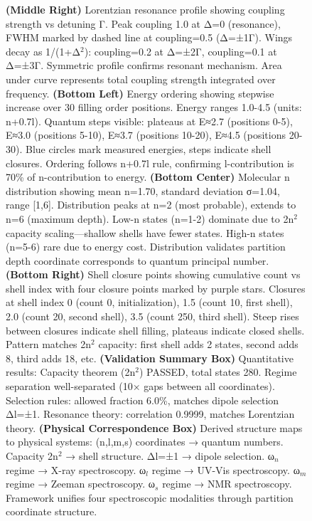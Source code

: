 \begin{figure}[htbp]
{    \textbf{(Middle Right)} Lorentzian resonance profile showing coupling strength vs detuning Γ. Peak coupling 1.0 at Δ=0 (resonance), FWHM marked by dashed line at coupling=0.5 (Δ=±1Γ). Wings decay as 1/(1+Δ$^2$): coupling=0.2 at Δ=±2Γ, coupling=0.1 at Δ=±3Γ. Symmetric profile confirms resonant mechanism. Area under curve represents total coupling strength integrated over frequency. 
    \textbf{(Bottom Left)} Energy ordering showing stepwise increase over 30 filling order positions. Energy ranges 1.0-4.5 (units: n+0.7l). Quantum steps visible: plateaus at E≈2.7 (positions 0-5), E≈3.0 (positions 5-10), E≈3.7 (positions 10-20), E≈4.5 (positions 20-30). Blue circles mark measured energies, steps indicate shell closures. Ordering follows n+0.7l rule, confirming l-contribution is 70\% of n-contribution to energy. 
    \textbf{(Bottom Center)} Molecular n distribution showing mean n=1.70, standard deviation σ=1.04, range [1,6]. Distribution peaks at n=2 (most probable), extends to n=6 (maximum depth). Low-n states (n=1-2) dominate due to 2n$^2$ capacity scaling—shallow shells have fewer states. High-n states (n=5-6) rare due to energy cost. Distribution validates partition depth coordinate corresponds to quantum principal number. 
    \textbf{(Bottom Right)} Shell closure points showing cumulative count vs shell index with four closure points marked by purple stars. Closures at shell index 0 (count 0, initialization), 1.5 (count 10, first shell), 2.0 (count 20, second shell), 3.5 (count 250, third shell). Steep rises between closures indicate shell filling, plateaus indicate closed shells. Pattern matches 2n$^2$ capacity: first shell adds 2 states, second adds 8, third adds 18, etc. 
    \textbf{(Validation Summary Box)} Quantitative results: Capacity theorem (2n$^2$) PASSED, total states 280. Regime separation well-separated (10× gaps between all coordinates). Selection rules: allowed fraction 6.0\%, matches dipole selection Δl=±1. Resonance theory: correlation 0.9999, matches Lorentzian theory. 
    \textbf{(Physical Correspondence Box)} Derived structure maps to physical systems: (n,l,m,s) coordinates → quantum numbers. Capacity 2n$^2$ → shell structure. Δl=±1 → dipole selection. ω$_n$ regime → X-ray spectroscopy. ω$_l$ regime → UV-Vis spectroscopy. ω$_m$ regime → Zeeman spectroscopy. ω$_s$ regime → NMR spectroscopy. Framework unifies four spectroscopic modalities through partition coordinate structure.}
    \label{fig:partition_coordinate_validation}
\end{figure}

